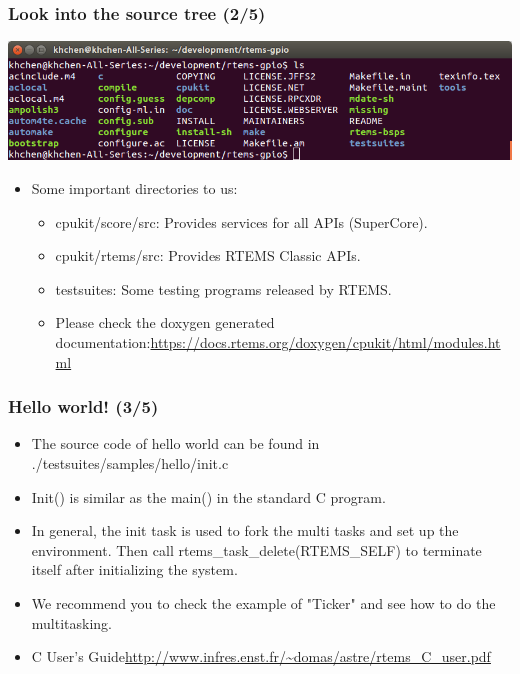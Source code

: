 \documentclass[t]{beamer}
\begin{document}
\begin{frame}
\frametitle{Look into the source tree (2/5)}
    \begin{center}
      \includegraphics[width=\textwidth]{sourcetree}
    \end{center}
\begin{itemize}
\item Some important directories to us:
\begin{itemize}
\item cpukit/score/src: Provides services for all APIs (SuperCore).
\item cpukit/rtems/src: Provides RTEMS Classic APIs.
\item testsuites: Some testing programs released by RTEMS.
\item Please check the doxygen generated documentation:\newline \url{https://docs.rtems.org/doxygen/cpukit/html/modules.html}
\end{itemize}
\end{itemize}
\end{frame}

\begin{frame}
\frametitle{Hello world! (3/5)}
\begin{itemize}
\item The source code of hello world can be found in ./testsuites/samples/hello/init.c
\item Init() is similar as the main() in the standard C program.
\item In general, the init task is used to fork the multi tasks and set up the environment. Then call rtems\_task\_delete(RTEMS\_SELF) to terminate itself after initializing the system.
\item We recommend you to check the example of "Ticker" and see how to do the multitasking.
\item C User's Guide\newline \url{http://www.infres.enst.fr/~domas/astre/rtems_C_user.pdf}

\end{itemize}
\end{frame}
\end{document}
